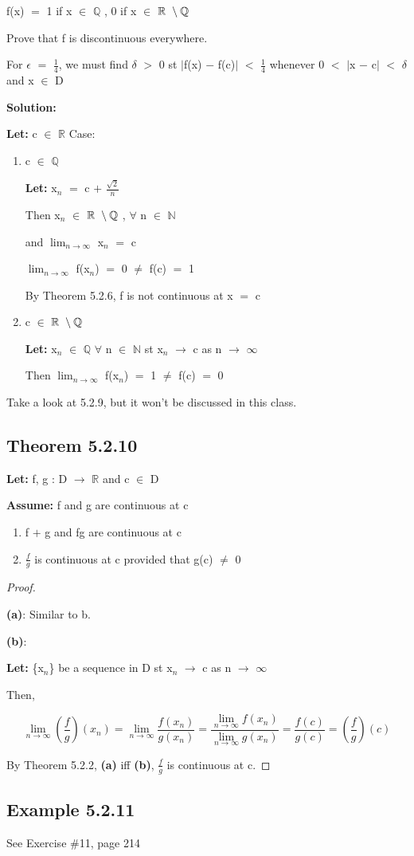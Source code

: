 \documentclass{article}
\newcommand{\mt}[1]{\ensuremath{#1}}
\newcommand\ssc[2][\DefaultOpt]{%
  \def\DefaultOpt{#2}%
  \subsection[#1]{#2}%
}
\newcommand{\bgpf}{\begin{proof} $ $\newline}
\newcommand{\balist}{\begin{enumerate}[label=\alph*.]}
\newcommand{\elist}{\end{enumerate}}
\newcommand{\bilist}{\begin{enumerate}[label=\roman*)]}
\newcommand{\lt}[1]{\textbf{Let: } #1}
\newcommand{\as}[1]{\textbf{Assume: } #1}
\newcommand{\bpth}[1]{\textbf{(#1)}}
\newcommand{\epf}{\end{proof}}
\newcommand{\br}{\mt{\mathbb{R}} }       %
\newcommand{\bq}{\mt{\mathbb{Q}} }       %
\newcommand{\bn}{\mt{\mathbb{N}} }       %
\newcommand{\ep}{\mt{\epsilon} }         %
\newcommand{\fa}{\mt{\forall} }          %
\newcommand{\dta}{\mt{\delta} }
\newcommand{\mem}{\mt{\in} }
\newcommand{\lra}{ \mt{\longrightarrow} } %
\newcommand{\av}[1]{\mt{|}#1\mt{|}}  %
\newcommand{\bk}[1]{\{#1\}}
\newcommand{\ps}{\mt{+} }
\newcommand{\ms}{\mt{-} }
\newcommand{\ls}{\mt{<} }
\newcommand{\gr}{\mt{>} }
\newcommand{\eql}{\mt{=} }
\newcommand{\uw}[2]{#1\mt{_{#2}}}
\newcommand{\frc}[2]{\mt{\frac{#1}{#2}}}
\newcommand{\lmti}[1]{\mt{\displaystyle{\lim_{#1 \to \infty}}}}
\newcommand{\bnt}[2]{\mt{\textrm{#1}\setminus{\textrm{#2}}}}
\newcommand{\eqn}[1]{\[#1\]}
\newcommand{\infy}{\mt{\infty} }
\begin{document}
{{f(x) \eql 1 if x \mem \bq, 0 if x \mem \bnt{\br}{\bq}

Prove that f is discontinuous everywhere.

For \ep \eql \frc{1}{4}, we must find \dta \gr 0 st \av{f(x) \ms f(c)} \ls \frc{1}{4} whenever 0 \ls \av{x \ms c} \ls \dta and x \mem D

\textbf{Solution:}

\lt{c \mem \br}
Case:
\bilist
\item c \mem \bq
	
	\lt{\uw{x}{n} \eql c \ps \frc{\sqrt{2}}{n}}
	
	Then \uw{x}{n} \mem \bnt{\br}{\bq}, \fa n \mem \bn
	
	and \lmti{n} \uw{x}{n} \eql c
	
	\lmti{n} f(\uw{x}{n}) \eql 0 $\neq$ f(c) \eql 1
	
	By Theorem 5.2.6, f is not continuous at x \eql c
	
\item c \mem \bnt{\br}{\bq}
	
	\lt{\uw{x}{n} \mem \bq \fa n \mem \bn st \uw{x}{n} \lra c as n \lra \infy}
	
	Then \lmti{n} f(\uw{x}{n}) \eql 1 $\neq$ f(c) \eql 0
\elist

}

Take a look at 5.2.9, but it won't be discussed in this class.

\ssc{Theorem 5.2.10}{

\lt{f, g : D \lra \br and c \mem D}

\as{f and g are continuous at c}

\balist
\item f \ps g and fg are continuous at c
\item \frc{f}{g} is continuous at c provided that g(c) $\neq$ 0
\elist

\bgpf

\bpth{a}: Similar to b.

\bpth{b}:

\lt{\bk{\uw{x}{n}} be a sequence in D st \uw{x}{n} \lra c as n \lra \infy}

Then, 

\eqn{\lmti{n} (\frc{f}{g})(\uw{x}{n}) = \lmti{n} \frc{f(\uw{x}{n})}{g(\uw{x}{n})} = \frac{\lmti{n} f(x_n)}{\lmti{n} g(x_n)} = \frc{f(c)}{g(c)} = (\frc{f}{g})(c)}

By Theorem 5.2.2, \bpth{a} iff \bpth{b}, \frc{f}{g} is continuous at c.
\epf
}

\ssc{Example 5.2.11}{
See Exercise \#11, page 214

}}
\end{document}
